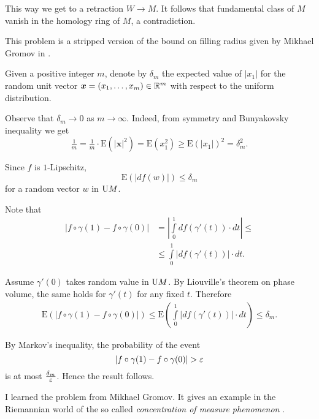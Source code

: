 This way we get 
to a retraction $W\to M$.
It follows that fundamental class of $M$ vanish in the homology ring of $M$, 
a contradiction. 
\qeds


This problem is a stripped version of the bound on filling radius given by Mikhael Gromov in \cite{gromov-filling}.  

Given a positive integer $m$,
denote by $\delta_m$ 
the expected value of $|x_1|$ for the random unit vector 
$\bm{x}\z=(x_1,\dots,x_m)\z\in\RR^m$ 
with respect to the uniform distribution.

Observe that $\delta_m\to 0$ as $m\to\infty$.
Indeed, from symmetry and Bunyakovsky inequality we get
\[
\tfrac1m=\tfrac1m\cdot\mathrm{E}(|\bm{x}|^2)
=\mathrm{E}(x_1^2)\ge \mathrm{E}(|x_1|)^2=\delta_m^2.
\]

Since $f$ is $1$-Lipschitz,
\[\mathrm{E}(|df(w)|)\le\delta_m\]
for a random vector $w$ in $\mathrm{U} M$.


Note that 
\begin{align*}
|f\circ \gamma(1)-f\circ\gamma(0)|
&=
\left|\int\limits_0^1df(\gamma'(t))\cdot dt\right|\le \\
&\le \int\limits_0^1\left|df(\gamma'(t))\right|\cdot dt.
\end{align*}

Assume $\gamma'(0)$
takes random value in $\mathrm{U} M$.
By Liouville's theorem on phase volume, the same holds for $\gamma'(t)$
for any fixed $t$.
Therefore
\begin{align*}
\mathrm{E}(|f\circ \gamma(1)-f\circ\gamma(0)|)\le \mathrm{E}\left(\int\limits_0^1|df(\gamma'(t))|\cdot dt\right)\le\delta_m.
\end{align*}

By Markov's inequality,
the probability of the event 
\[|f\circ \gamma(1)-f\circ\gamma(0)|>\eps\]
is at most $\tfrac{\delta_m}{\varepsilon}$.
Hence the result follows.
\qeds

I learned the problem from Mikhael Gromov.
It gives an example in the Riemannian world
of the so called 
\emph{concentration of measure phenomenon}
\cite[see][]{milman-schechtman,ledoux}.
 
